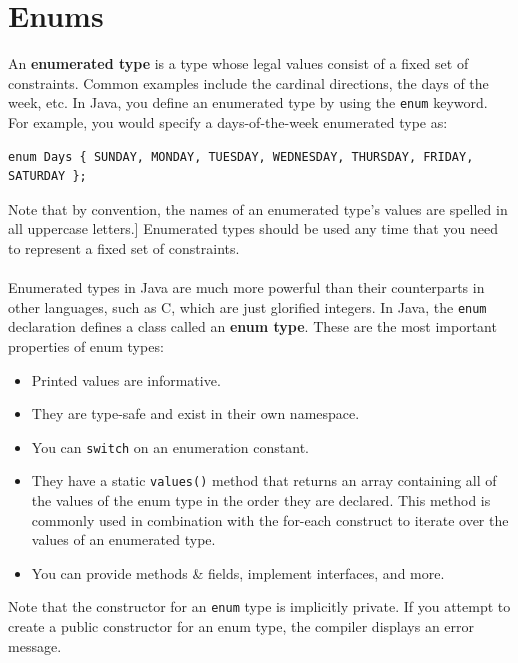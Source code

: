 \documentclass[a4paper,11pt]{article}
\begin{document}
\section{Enums}
An \textbf{enumerated type} is a type whose legal values consist of a fixed set of constraints. 
Common examples include the cardinal directions, the days of the week, etc.
In Java, you define an enumerated type by using the \verb|enum| keyword. 
For example, you would specify a days-of-the-week enumerated type as: 
\begin{verbatim}
enum Days { SUNDAY, MONDAY, TUESDAY, WEDNESDAY, THURSDAY, FRIDAY, SATURDAY };
\end{verbatim}
Note that by convention, the names of an enumerated type's values are spelled in all uppercase letters.]
Enumerated types should be used any time that you need to represent a fixed set of constraints.
\\\\ 
Enumerated types in Java are much more powerful than their counterparts in other languages, such as C, which are just 
glorified integers. 
In Java, the \verb|enum| declaration defines a class called an \textbf{enum type}.
These are the most important properties of enum types:
\begin{itemize}
    \item   Printed values are informative.
    \item   They are type-safe and exist in their own namespace.
    \item   You can \verb|switch| on an enumeration constant.
    \item   They have a static \verb|values()| method that returns an array containing all of the values of the enum type
            in the order they are declared. 
            This method is commonly used in combination with the for-each construct to iterate over the values of an 
            enumerated type.
    \item   You can provide methods \& fields, implement interfaces, and more.
\end{itemize}

Note that the constructor for an \verb|enum| type is implicitly private. 
If you attempt to create a public constructor for an enum type, the compiler displays an error message. 
\end{document}
